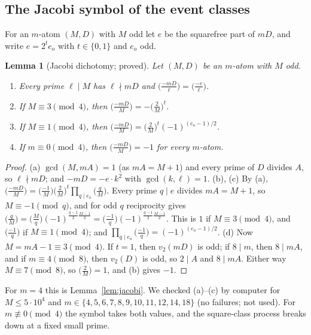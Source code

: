 \documentclass[11pt,reqno]{amsart}
\newtheorem{lemma}[theorem]{Lemma}
\theoremstyle{definition}
\begin{document}
\subsection*{The Jacobi symbol of the event classes}
For an $m$-atom $(M,D)$ with $M$ odd let $e$ be the squarefree part of $mD$, and
write $e=2^te_o$ with $t\in\{0,1\}$ and $e_o$ odd.

\begin{lemma}[Jacobi dichotomy; proved]\label{lem:mjacobi}
Let $(M,D)$ be an $m$-atom with $M$ odd.
\begin{enumerate}
\item[(a)] Every prime $\ell\mid M$ has $\ell\nmid mD$ and $\big(\frac{-mD}\ell\big)=\big(\frac{-e}\ell\big)$.
\item[(b)] If $M\equiv3\pmod4$, then $\big(\frac{-mD}M\big)=-\big(\frac2M\big)^t$.
\item[(c)] If $M\equiv1\pmod4$, then $\big(\frac{-mD}M\big)=\big(\frac2M\big)^t(-1)^{(e_o-1)/2}$.
\item[(d)] If $m\equiv0\pmod4$, then $\big(\frac{-mD}M\big)=-1$ for every $m$-atom.
\end{enumerate}
\end{lemma}

\begin{proof}
(a) $\gcd(M,mA)=1$ (as $mA=M+1$) and every prime of $D$ divides $A$, so $\ell\nmid mD$;
and $-mD=-e\cdot k^2$ with $\gcd(k,\ell)=1$.  (b), (c) By (a),
$\big(\frac{-mD}M\big)=\big(\frac{-1}M\big)\big(\frac2M\big)^t\prod_{q\mid e_o}\big(\frac qM\big)$.
Every prime $q\mid e$ divides $mA=M+1$, so $M\equiv-1\pmod q$, and for odd $q$
reciprocity gives
$\big(\frac qM\big)=\big(\frac Mq\big)(-1)^{\frac{q-1}2\frac{M-1}2}=\big(\frac{-1}q\big)(-1)^{\frac{q-1}2\frac{M-1}2}$.
This is $1$ if $M\equiv3\pmod4$, and $\big(\frac{-1}q\big)$ if $M\equiv1\pmod4$; and
$\prod_{q\mid e_o}\big(\frac{-1}q\big)=(-1)^{(e_o-1)/2}$.  (d) Now $M=mA-1\equiv3\pmod4$.  If
$t=1$, then $v_2(mD)$ is odd; if $8\mid m$, then $8\mid mA$, and if $m\equiv4\pmod8$,
then $v_2(D)$ is odd, so $2\mid A$ and $8\mid mA$.  Either way $M\equiv7\pmod8$, so
$\big(\frac2M\big)=1$, and (b) gives $-1$.
\end{proof}

For $m=4$ this is Lemma~\ref{lem:jacobi}.  We checked (a)--(c) by computer for
$M\le5\cdot10^4$ and $m\in\{4,5,6,7,8,9,10,11,12,14,18\}$ (no failures; not used).  For
$m\not\equiv0\pmod4$ the symbol takes both values, and the square-class process
breaks down at a fixed small prime.
\end{document}
